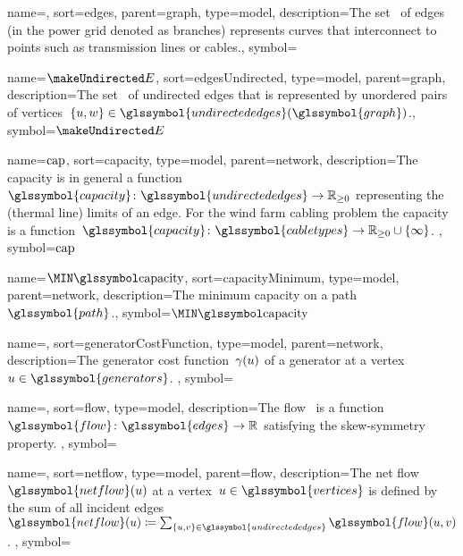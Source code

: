 {
    name={\edges},
    sort={edges},
    parent={graph},
    type={model},
    description={The set~ of edges (in the power grid denoted
    as branches) represents curves that interconnect to points such as
    transmission lines or cables.},
    symbol={\edges}
}

{
    name={\ensuremath{\protect\undirectededges}},%
    sort={edgesUndirected},
    type={model},
    parent={graph},
    description={The set~ of undirected edges that is
    represented by unordered pairs of vertices~$
    \{\vertexa,\vertexc\}\in\glssymbol{undirectededges}(\glssymbol{graph})$.},
    symbol={\ensuremath{\protect\undirectededges}}%
}

{
    name={\ensuremath{\capacity}},
    sort={capacity},
    type={model},
    parent={network},
    description={The capacity is in general a function~$\glssymbol{capacity}
    \colon \glssymbol{undirectededges}\to\posreals$ representing the (thermal
    line) limits of an edge. For the wind farm cabling problem the capacity is a
    function~$
    \glssymbol{capacity} 
    \colon
    \glssymbol{cabletypes} 
    \to 
    \posreals 
    \cup 
    \{\infty\}$.
    },
    symbol={\ensuremath{\capacity}}
}

{
    name={\ensuremath{ \mincapacity }},
    sort={capacityMinimum},
    type={model},
    parent={network},
    description={The minimum capacity on a path~$\glssymbol{path}$.},
    symbol={\ensuremath{ \mincapacity }}
}

{
    name={\gamma},
    sort={generatorCostFunction},
    type={model},
    parent={network},
    description={The generator cost function~$\gamma(u)$ of a generator
    at a vertex~$\vertexa\in\glssymbol{generators}$.
    },
    symbol={\gamma}
}

{
    name={\flow},
    sort={flow},
    type={model},
    description={The flow~ is a function~$\glssymbol{flow}
    \colon \glssymbol{edges} \to \reals$ satisfying the skew-symmetry property.
    },
    symbol={\flow}
}

{
    name={\netflow},
    sort={netflow},
    type={model},
    parent={flow},
    description={The net flow~$\glssymbol{netflow}(\vertexa)$ at a
    vertex~$\vertexa\in\glssymbol{vertices}$ is defined by the sum of all incident
    edges~$\glssymbol{netflow}(\vertexa)\coloneqq\sum_{
    \{\vertexa,\vertexb\}\in\glssymbol{undirectededges}}\glssymbol{flow}
    (\vertexa,\vertexb)$.
    },
    symbol={\netflow}
}

